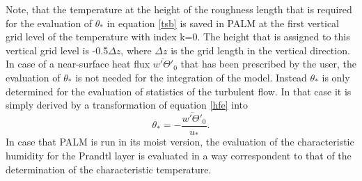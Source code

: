 \documentclass[11pt,a4paper,titlepage]{scrreprt}
\begin{document}
Note, that the temperature at the height of the roughness length that is required for the evaluation of $\theta_{\ast}$ in equation \ref{tsb} is saved 
in PALM at the first vertical grid level of the temperature with index k=0. The height that is assigned to this vertical grid level is -0.5$\Delta z$, 
where $\Delta z$ is the grid length in the vertical direction.   
In case of a near-surface heat flux $\overline{w'\Theta'}_0$ that has been prescribed by the user, the evaluation of $\theta_{\ast}$ is not needed for 
the integration of the model. Instead $\theta_{\ast}$ is only determined for the evaluation of statistics of the turbulent flow. In that case it is 
simply derived by a transformation of equation \ref{hfe} into  
\begin{equation}
\theta_{\ast} = - \frac{\overline{w'\Theta'}_0}{u_{\ast}}.
\end{equation}    
In case that PALM is run in its moist version, the evaluation of the characteristic humidity for the Prandtl layer is evaluated in a way correspondent to 
that of the determination of the characteristic temperature.


  
  
 
        

 

 


 







 
  

 
\end{document}
